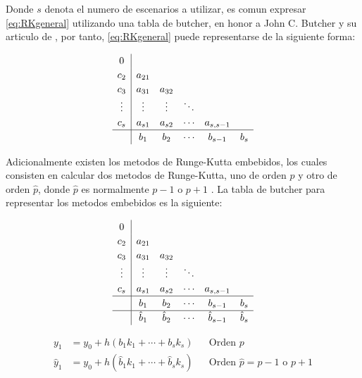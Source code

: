         Donde $s$ denota el numero de escenarios a utilizar, es comun expresar \cref{eq:RKgeneral} utilizando una tabla de butcher, en honor a John C. Butcher y su articulo de \citeyear{butcher1964runge}, por tanto, \cref{eq:RKgeneral} puede representarse de la siguiente forma:

        \begin{equation}\label{eq:explicitoButcher}
            \renewcommand\arraystretch{1.2}
            \begin{array}
            {c|ccccc}
            0\\
            c_2 & a_{21}\\
            c_3 & a_{31} & a_{32}\\
            \vdots & \vdots & \vdots & \ddots\\
            c_s & a_{s1} & a_{s2} & \cdots & a_{s,s-1}\\
            \hline
            & b_1 & b_2 & \cdots & b_{s-1} &  b_{s}
            \end{array}
        \end{equation}

        Adicionalmente existen los metodos de Runge-Kutta embebidos, los cuales consisten en calcular dos metodos de Runge-Kutta, uno de orden $p$ y otro de orden $\hat{p}$, donde $\hat{p}$ es normalmente $p-1$ o $p+1$ \Parencite{hairer1991solving}. La tabla de butcher para representar los metodos embebidos es la siguiente:
        
        \pagebreak

        \begin{equation}\label{eq:embebidoButcher}
            \renewcommand\arraystretch{1.2}
            \begin{array}
            {c|ccccc}
            0\\
            c_2 & a_{21}\\
            c_3 & a_{31} & a_{32}\\
            \vdots & \vdots & \vdots & \ddots\\
            c_s & a_{s1} & a_{s2} & \cdots & a_{s,s-1}\\
            \hline
            & b_1 & b_2 & \cdots & b_{s-1} &  b_{s}\\
            \hline
            & \hat{b}_1 & \hat{b}_2 & \cdots & \hat{b}_{s-1} &  \hat{b}_{s}
            \end{array}
        \end{equation}

        \begin{align}
            y_1 &= y_0 + h(b_1 k_1 + \cdots + b_s k_s) & &\text{Orden $p$}\\
            \hat{y}_1 &= y_0 + h(\hat{b}_1 k_1 + \cdots +\hat{b}_s k_s) & &\text{Orden $\hat{p} = p-1$ o $p+1$}
        \end{align}

